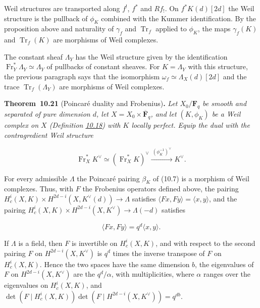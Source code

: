 \documentclass[11pt]{article}
\newenvironment{bpstatement}[2]{\par\addvspace{0.6\baselineskip}\noindent\textbf{#1}#2\textbf{.}\enspace\ignorespaces}
  {\par\addvspace{0.4\baselineskip}}
\newenvironment{bpstatementit}[2]{\begin{bpstatement}{#1}{#2}\itshape\ignorespaces}{\end{bpstatement}}
\begin{document}
\label{bp164}%
Weil structures are transported along \(f^!\), \(f^*\) and \(Rf_!\). On \(f^*K(d)[2d]\) the Weil structure is the pullback of \(\phi_K\) combined with the Kummer identification. By the proposition above and naturality of \(\gamma_f\) and \(\operatorname{Tr}_f\) applied to \(\phi_K\), the maps \(\gamma_f(K)\) and \(\operatorname{Tr}_f(K)\) are morphisms of Weil complexes.

The constant sheaf \(\Lambda_Y\) has the Weil structure given by the identification \(\operatorname{Fr}_Y^*\Lambda_Y\simeq\Lambda_Y\) of pullbacks of constant sheaves. For \(K=\Lambda_Y\) with this structure, the previous paragraph says that the isomorphism \(\omega_f\simeq\Lambda_X(d)[2d]\) and the trace \(\operatorname{Tr}_f(\Lambda_Y)\) are morphisms of Weil complexes.

\label{bp165}%
\begin{bpstatementit}{Theorem~10.21}{ (Poincaré duality and Frobenius)}
Let \(X_0/\mathbf F_q\) be smooth and separated of pure dimension \(d\), let \(X=X_0\times\overline{\mathbf F}_q\), and let \((K,\phi_K)\) be a Weil complex on \(X\) (Definition \hyperref[bp156]{10.18}) with \(K\) locally perfect. Equip the dual with the contragredient Weil structure

\[
\operatorname{Fr}_X^*K^\vee
\simeq(\operatorname{Fr}_X^*K)^\vee
\xrightarrow{\ (\phi_K^{-1})^\vee\ }K^\vee.
\]

For every admissible \(\Lambda\) the Poincaré pairing \(\beta_K\) of (10.7) is a morphism of Weil complexes. Thus, with \(F\) the Frobenius operators defined above, the pairing \(H^i_c(X,K)\times H^{2d-i}(X,K^\vee(d))\to\Lambda\) satisfies \(\langle Fx,Fy\rangle=\langle x,y\rangle\), and the pairing \(H^i_c(X,K)\times H^{2d-i}(X,K^\vee)\to\Lambda(-d)\) satisfies

\[
\langle Fx,Fy\rangle=q^d\langle x,y\rangle.
\]

If \(\Lambda\) is a field, then \(F\) is invertible on \(H^i_c(X,K)\), and with respect to the second pairing \(F\) on \(H^{2d-i}(X,K^\vee)\) is \(q^d\) times the inverse transpose of \(F\) on \(H^i_c(X,K)\). Hence the two spaces have the same dimension \(b\), the eigenvalues of \(F\) on \(H^{2d-i}(X,K^\vee)\) are the \(q^d/\alpha\), with multiplicities, where \(\alpha\) ranges over the eigenvalues on \(H^i_c(X,K)\), and \(\det(F\mid H^i_c(X,K))\det(F\mid H^{2d-i}(X,K^\vee))=q^{db}\).
\end{bpstatementit}
\end{document}
